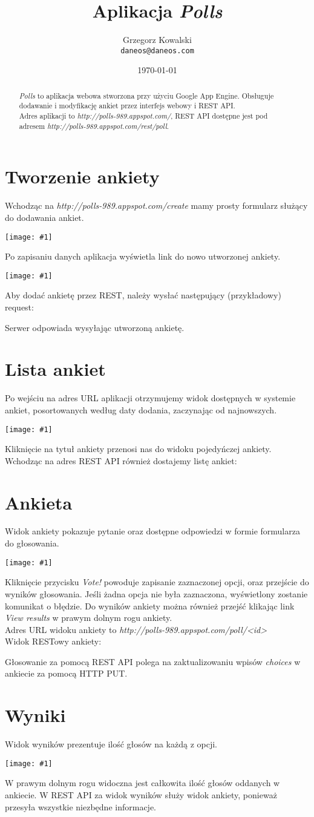 \documentclass[12pt,a4paper]{article}
\title{Aplikacja \emph{Polls}}
\author{Grzegorz Kowalski\\\texttt{daneos@daneos.com}}
\date{\today}
\newcommand{\screenshot}[1]{\\\begin{minipage}[c]{\textwidth}\hspace{0em}\texttt{[image: \#1]}\end{minipage}\vspace{0em}}
\newcommand{\adres}[1]{\emph{http://polls-989.appspot.com/#1}}
\begin{document}
\maketitle

\begin{abstract}
\emph{Polls} to aplikacja webowa stworzona przy użyciu Google App Engine. Obsługuje dodawanie i modyfikację ankiet przez interfejs webowy i REST API.\\
Adres aplikacji to \adres{}, REST API dostępne jest pod adresem \adres{rest/poll}.
\end{abstract}

\section{Tworzenie ankiety}
Wchodząc na \adres{create} mamy prosty formularz służący do dodawania ankiet.
\screenshot{new_poll.png}
Po zapisaniu danych aplikacja wyświetla link do nowo utworzonej ankiety.
\screenshot{created.png}
\newpage
Aby dodać ankietę przez REST, należy wysłać następujący (przykładowy) request:

Serwer odpowiada wysyłając utworzoną ankietę.

\section{Lista ankiet}
Po wejściu na adres URL aplikacji otrzymujemy widok dostępnych w systemie ankiet, posortowanych według daty dodania, zaczynając od najnowszych.
\screenshot{poll_list.png}
Kliknięcie na tytuł ankiety przenosi nas do widoku pojedyńczej ankiety.
Wchodząc na adres REST API również dostajemy listę ankiet:


\section{Ankieta}
Widok ankiety pokazuje pytanie oraz dostępne odpowiedzi w formie formularza do głosowania.
\screenshot{poll.png}
Kliknięcie przycisku \emph{Vote!} powoduje zapisanie zaznaczonej opcji, oraz przejście do wyników głosowania. Jeśli żadna opcja nie była zaznaczona, wyświetlony zostanie komunikat o błędzie. Do wyników ankiety można również przejść klikając link \emph{View results} w prawym dolnym rogu ankiety.\\
Adres URL widoku ankiety to \adres{poll/<id>}\\
Widok RESTowy ankiety:

Głosowanie za pomocą REST API polega na zaktualizowaniu wpisów \emph{choices} w ankiecie za pomocą HTTP PUT.


\section{Wyniki}
Widok wyników prezentuje ilość głosów na każdą z opcji.
\screenshot{poll_results.png}
W prawym dolnym rogu widoczna jest całkowita ilość głosów oddanych w ankiecie.
W REST API za widok wyników służy widok ankiety, ponieważ przesyła wszystkie niezbędne informacje.
\end{document}
